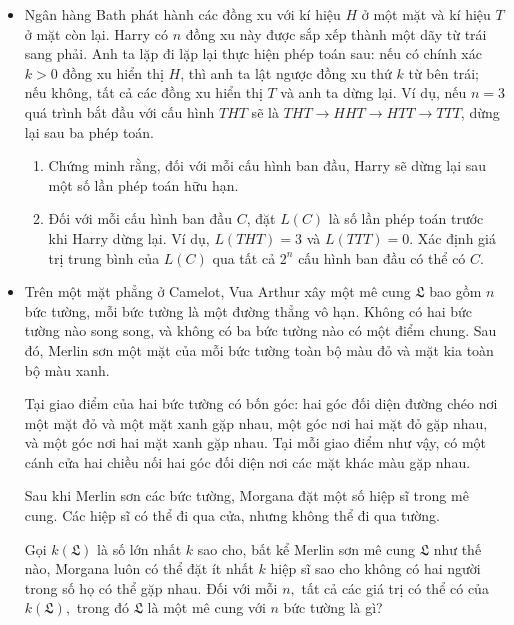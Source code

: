 \documentclass[11pt]{scrartcl}
\begin{document}
\begin{itemize}[label=, leftmargin=0em, itemsep=-0em]
    \item \begin{btvn}
        Ngân hàng Bath phát hành các đồng xu với kí hiệu $H$ ở một mặt và kí hiệu $T$ ở mặt còn lại. Harry có $n$ đồng xu này được sắp xếp thành một dãy từ trái sang phải. Anh ta lặp đi lặp lại thực hiện phép toán sau: nếu có chính xác $k>0$ đồng xu hiển thị $H$, thì anh ta lật ngược đồng xu thứ $k$ từ bên trái; nếu không, tất cả các đồng xu hiển thị $T$ và anh ta dừng lại. Ví dụ, nếu $n=3$ quá trình bắt đầu với cấu hình $THT$ sẽ là $THT \to HHT \to HTT \to TTT$, dừng lại sau ba phép toán.
        \begin{enumerate}[label=(\alph*)]
            \item Chứng minh rằng, đối với mỗi cấu hình ban đầu, Harry sẽ dừng lại sau một số lần phép toán hữu hạn.
            \item Đối với mỗi cấu hình ban đầu $C$, đặt $L(C)$ là số lần phép toán trước khi Harry dừng lại. Ví dụ, $L(THT) = 3$ và $L(TTT) = 0$. Xác định giá trị trung bình của $L(C)$ qua tất cả $2^n$ cấu hình ban đầu có thể có $C$.
        \end{enumerate}
    \end{btvn}

    \item \begin{btvn}
        Trên một mặt phẳng ở Camelot, Vua Arthur xây một mê cung $\mathfrak{L}$ bao gồm $n$ bức tường, mỗi bức tường là một đường thẳng vô hạn. Không có hai bức tường nào song song, và không có ba bức tường nào có một điểm chung. Sau đó, Merlin sơn một mặt của mỗi bức tường toàn bộ màu đỏ và mặt kia toàn bộ màu xanh.

        Tại giao điểm của hai bức tường có bốn góc: hai góc đối diện đường chéo nơi một mặt đỏ và một mặt xanh gặp nhau, một góc nơi hai mặt đỏ gặp nhau, và một góc nơi hai mặt xanh gặp nhau. Tại mỗi giao điểm như vậy, có một cánh cửa hai chiều nối hai góc đối diện nơi các mặt khác màu gặp nhau.

        Sau khi Merlin sơn các bức tường, Morgana đặt một số hiệp sĩ trong mê cung. Các hiệp sĩ có thể đi qua cửa, nhưng không thể đi qua tường.

        Gọi $k(\mathfrak{L})$ là số lớn nhất $k$ sao cho, bất kể Merlin sơn mê cung $\mathfrak{L}$ như thế nào, Morgana luôn có thể đặt ít nhất $k$ hiệp sĩ sao cho không có hai người trong số họ có thể gặp nhau. Đối với mỗi $n,$ tất cả các giá trị có thể có của $k(\mathfrak{L}),$ trong đó $\mathfrak{L}$ là một mê cung với $n$ bức tường là gì?
    \end{btvn}


\end{itemize}
\end{document}
